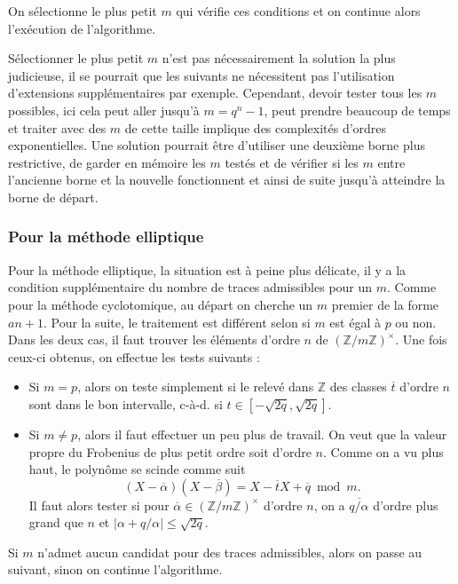 \documentclass[a4paper]{article} %
\numberwithin{section}{part}
\numberwithin{equation}{section}
\newcommand\zmodninv[1]{(\mathbb{Z}/#1\mathbb{Z})^{\times}}
\newcommand\ZZ{\mathbb{Z}}
\begin{document}
On sélectionne le plus petit $m$ qui vérifie ces conditions et on continue alors
l'exécution de l'algorithme.

\begin{rem}
Sélectionner le plus petit $m$ n'est pas nécessairement la solution la plus
judicieuse, il se pourrait que les suivants ne nécessitent pas l'utilisation
d'extensions supplémentaires par exemple. Cependant, devoir tester tous les $m$
possibles, ici cela peut aller jusqu'à $m = q^n - 1$, peut prendre beaucoup de
temps et traiter avec des $m$ de cette taille implique des complexités d'ordres
exponentielles. Une solution pourrait être d'utiliser une deuxième borne plus
restrictive, de garder en mémoire les $m$ testés et de vérifier si les $m$ entre
l'ancienne borne et la nouvelle fonctionnent et ainsi de suite jusqu'à atteindre
la borne de départ.
\end{rem}

\subsubsection*{Pour la méthode elliptique}
\label{sec:recherchermell}
Pour la méthode elliptique, la situation est à peine plus délicate, il y a la
condition supplémentaire du nombre de traces admissibles pour un $m$. Comme pour
la méthode cyclotomique, au départ on cherche un $m$ premier de la forme 
$an + 1$.  Pour la suite, le traitement est différent selon si $m$ est égal à 
$p$ ou non. Dans les deux cas, il faut trouver les éléments d'ordre $n$ de 
$\zmodninv{m}$. Une fois ceux-ci obtenus, on effectue les tests suivants :
\vspace{0.3cm}
\begin{itemize}
    \item Si $m = p$, alors on teste simplement si le relevé dans $\ZZ$ des
    classes $\overline{t}$ d'ordre $n$ sont dans le bon intervalle, 
    c-à-d. si $t\in[-\sqrt{2q},\sqrt{2q}]$.\vspace{0.2cm}

    \item Si $m\neq p$, alors il faut effectuer un peu plus de travail. On
    veut que la valeur propre du Frobenius de plus petit ordre soit d'ordre $n$.
    Comme on a vu plus haut, le polynôme se scinde comme suit 
    \[(X - \overline{\alpha})(X- \overline{\beta})= X -\overline{t}X + 
    \overline{q}\bmod m.\] 
    Il faut alors tester si pour $\overline{\alpha}\in\zmodninv{m}$ 
    d'ordre $n$, on a $\overline{q/\alpha}$ d'ordre plus grand que $n$ et 
    $\vert{\alpha + q/\alpha}\vert\leq\sqrt{2q}$.
\end{itemize}
\vspace{0.3cm}
Si $m$ n'admet aucun candidat pour des traces admissibles, alors on passe
au suivant, sinon on continue l'algorithme.
\end{document}
